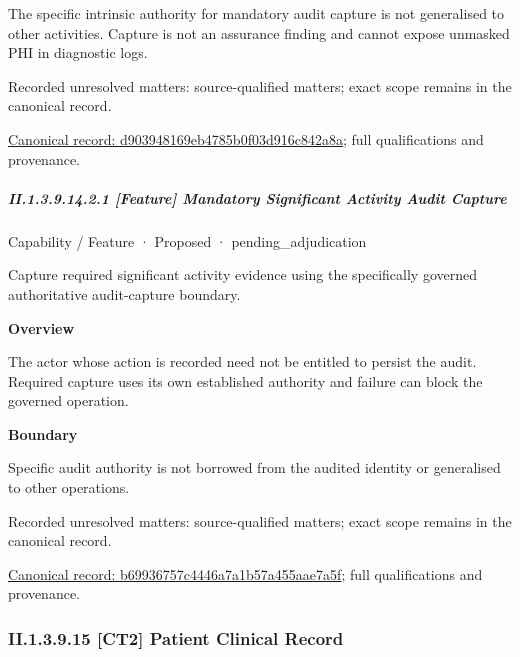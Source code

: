 The specific intrinsic authority for mandatory audit capture is not generalised to other activities. Capture is not an assurance finding and cannot expose unmasked PHI in diagnostic logs.


{\small Recorded unresolved matters: source-qualified matters; exact scope remains in the canonical record.}\par
{\footnotesize \href{../../../../continuum/strategy/capability/d903948169eb4785b0f03d916c842a8a.md}{Canonical record: d903948169eb4785b0f03d916c842a8a}; full qualifications and provenance.}\par
\subparagraph*{II.1.3.9.14.2.1 [Feature] Mandatory Significant Activity Audit Capture}
\label{navigation:II.1.3.9.14.2.1}

\label{element:b69936757c4446a7a1b57a455aae7a5f}
{\small Capability / Feature · Proposed · pending\_adjudication}\par

Capture required significant activity evidence using the specifically governed authoritative audit-capture boundary.



\textbf{Overview}



The actor whose action is recorded need not be entitled to persist the audit. Required capture uses its own established authority and failure can block the governed operation.



\textbf{Boundary}



Specific audit authority is not borrowed from the audited identity or generalised to other operations.


{\small Recorded unresolved matters: source-qualified matters; exact scope remains in the canonical record.}\par
{\footnotesize \href{../../../../continuum/strategy/capability/feature/b69936757c4446a7a1b57a455aae7a5f.md}{Canonical record: b69936757c4446a7a1b57a455aae7a5f}; full qualifications and provenance.}\par
\subsubsection*{II.1.3.9.15 [CT2] Patient Clinical Record}
\label{navigation:II.1.3.9.15}


